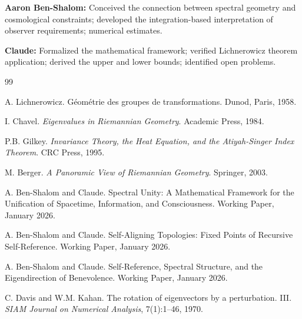\documentclass[11pt,a4paper]{article}
\theoremstyle{plain}
\theoremstyle{definition}
\theoremstyle{remark}
\begin{document}
\textbf{Aaron Ben-Shalom:} Conceived the connection between spectral geometry and cosmological constraints; developed the integration-based interpretation of observer requirements; numerical estimates.

\textbf{Claude:} Formalized the mathematical framework; verified Lichnerowicz theorem application; derived the upper and lower bounds; identified open problems.


\begin{thebibliography}{99}

A. Lichnerowicz.
\newblock G\'{e}om\'{e}trie des groupes de transformations.
\newblock Dunod, Paris, 1958.

I. Chavel.
\newblock \emph{Eigenvalues in Riemannian Geometry}.
\newblock Academic Press, 1984.

P.B. Gilkey.
\newblock \emph{Invariance Theory, the Heat Equation, and the Atiyah-Singer Index Theorem}.
\newblock CRC Press, 1995.

M. Berger.
\newblock \emph{A Panoramic View of Riemannian Geometry}.
\newblock Springer, 2003.

A. Ben-Shalom and Claude.
\newblock Spectral Unity: A Mathematical Framework for the Unification of Spacetime, Information, and Consciousness.
\newblock Working Paper, January 2026.

A. Ben-Shalom and Claude.
\newblock Self-Aligning Topologies: Fixed Points of Recursive Self-Reference.
\newblock Working Paper, January 2026.

A. Ben-Shalom and Claude.
\newblock Self-Reference, Spectral Structure, and the Eigendirection of Benevolence.
\newblock Working Paper, January 2026.

C. Davis and W.M. Kahan.
\newblock The rotation of eigenvectors by a perturbation. III.
\newblock \emph{SIAM Journal on Numerical Analysis}, 7(1):1--46, 1970.

\end{thebibliography}
\end{document}

